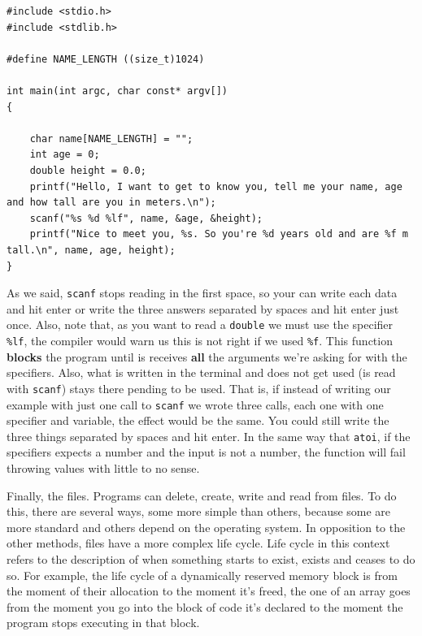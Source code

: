 \documentclass[a4paper]{article}
\begin{document}
\noindent
\begin{minipage}[H]{\linewidth}
\mbox{}
\begin{lstlisting}[style=C,
caption={\texttt{scanf} advanced example},
label={lst:scanfExample}]
#include <stdio.h>
#include <stdlib.h>

#define NAME_LENGTH ((size_t)1024)

int main(int argc, char const* argv[])
{

    char name[NAME_LENGTH] = "";
    int age = 0;
    double height = 0.0;
    printf("Hello, I want to get to know you, tell me your name, age and how tall are you in meters.\n");
    scanf("%s %d %lf", name, &age, &height);
    printf("Nice to meet you, %s. So you're %d years old and are %f m tall.\n", name, age, height);
}
\end{lstlisting}
\end{minipage}

As we said, \verb!scanf! stops reading in the first space, so your can write
each data and hit enter or write the three answers separated by spaces and hit
enter just once. Also, note that, as you want to read a \verb!double! we must
use the specifier \verb!%lf!, the
compiler would warn us this is not right if we used \verb!%f!. This function
\textbf{blocks} the program until is receives \textbf{all} the arguments we're
asking for with the specifiers. Also, what is written in the terminal and does
not get used (is read with \verb!scanf!) stays there pending to be used. That
is, if instead of writing our example with just one call to \verb!scanf! we
wrote three calls, each one with one specifier and variable, the effect would be
the same. You could still write the three things separated by spaces and hit
enter. In the same way that \verb!atoi!, if the specifiers expects a number and
the input is not a number, the function will fail throwing values with little to
no sense.

Finally, the files. Programs can delete, create, write and read from files.
To do this, there are several ways, some more simple than others, because some
are more standard and others depend on the operating system. In opposition
to the other methods, files have a more complex life cycle.
Life cycle in this context
refers to the description of when something starts to exist, exists and ceases
to do so. For example, the life cycle of a dynamically reserved memory block is
from the moment of their allocation to the moment it's freed, the one of an
array goes from the moment you go into the block of code it's declared to the
moment the program stops executing in that block.
\end{document}
